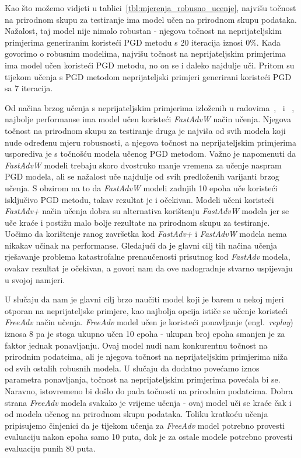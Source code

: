\documentclass[times, utf8, zavrsni, numeric]{fer}
\begin{document}
Kao što možemo vidjeti u tablici~\ref{tbl:mjerenja_robusno_ucenje}, najvišu točnost na prirodnom skupu za testiranje ima model učen na prirodnom skupu podataka.
Nažalost, taj model nije nimalo robustan - njegova točnost na neprijateljskim primjerima generiranim koristeći PGD metodu s 20 iteracija iznosi $0\%$.
Kada govorimo o robusnim modelima, najvišu točnost na neprijateljskim primjerima ima model učen koristeći PGD metodu, no on se i daleko najdulje uči.
Pritom su tijekom učenja s PGD metodom neprijateljski primjeri generirani koristeći PGD sa 7 iteracija.

Od načina brzog učenja s neprijateljskim primjerima izloženih u radovima~\cite{shafahi2019adversarial},~\cite{wong2020fast} i ~\cite{li2020towards},
najbolje performanse ima model učen koristeći \textit{FastAdvW} način učenja. Njegova točnost na prirodnom skupu za testiranje druga je najviša od svih modela koji nude određenu mjeru robusnosti,
a njegova točnost na neprijateljskim primjerima usporediva je s točnošću modela učenog PGD metodom. 
Važno je napomenuti da \textit{FastAdvW} modeli trebaju skoro dvostruko manje vremena za učenje naspram PGD modela, ali se nažalost uče najdulje od svih predloženih varijanti brzog učenja.
S obzirom na to da \textit{FastAdvW} modeli zadnjih 10 epoha uče koristeći isključivo PGD metodu, takav rezultat je i očekivan.
Modeli učeni koristeći \textit{FastAdv+} način učenja dobra su alternativa korištenju \textit{FastAdvW} modela jer se uče kraće i postižu malo bolje rezultate na prirodnom skupu za testiranje.
Uočimo da korištenje ranog završetka kod \textit{FastAdv+} i \textit{FastAdvW} modela nema nikakav učinak na performanse. 
Gledajući da je glavni cilj tih načina učenja rješavanje problema katastrofalne prenaučenosti prisutnog kod \textit{FastAdv} modela, ovakav rezultat je očekivan, 
a govori nam da ove nadogradnje stvarno uspijevaju u svojoj namjeri.

\pagebreak

U slučaju da nam je glavni cilj brzo naučiti model koji je barem u nekoj mjeri otporan na neprijateljske primjere, kao najbolja opcija ističe se učenje koristeći \textit{FreeAdv} način učenja.
\textit{FreeAdv} model učen je koristeći ponavljanje (engl.\ \textit{replay}) iznosa 8 pa je stoga ukupno učen 10 epoha - ukupan broj epoha smanjen je za faktor jednak ponavljanju.
Ovaj model nudi nam konkurentnu točnost na prirodnim podatcima, ali je njegova točnost na neprijateljskim primjerima niža od svih ostalih robusnih modela.
U slučaju da dodatno povećamo iznos parametra ponavljanja, točnost na neprijateljskim primjerima povećala bi se. Naravno, istovremeno bi došlo do pada točnosti na prirodnim podatcima.
Dobra strana \textit{FreeAdv} modela svakako je vrijeme učenja - ovaj model uči se kraće čak i od modela učenog na prirodnom skupu podataka. 
Toliku kratkoću učenja pripisujemo činjenici da je tijekom učenja za \textit{FreeAdv} model potrebno provesti evaluaciju nakon epoha samo 10 puta, dok je za ostale modele potrebno provesti evaluaciju punih 80 puta.
\end{document}
